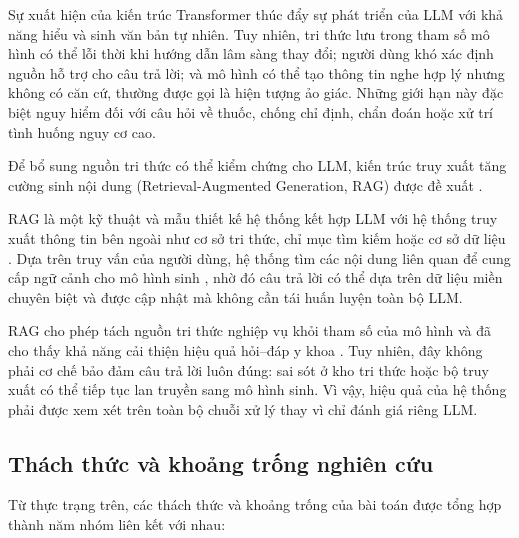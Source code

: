 Sự xuất hiện của kiến trúc Transformer \cite{vaswani2017} thúc đẩy sự phát triển của LLM với khả năng hiểu và sinh văn bản tự nhiên. Tuy nhiên, tri thức lưu trong tham số mô hình có thể lỗi thời khi hướng dẫn lâm sàng thay đổi; người dùng khó xác định nguồn hỗ trợ cho câu trả lời; và mô hình có thể tạo thông tin nghe hợp lý nhưng không có căn cứ, thường được gọi là hiện tượng ảo giác. Những giới hạn này đặc biệt nguy hiểm đối với câu hỏi về thuốc, chống chỉ định, chẩn đoán hoặc xử trí tình huống nguy cơ cao.

Để bổ sung nguồn tri thức có thể kiểm chứng cho LLM, kiến trúc truy xuất tăng cường sinh nội dung (Retrieval-Augmented Generation, RAG) được đề xuất \cite{lewis2020, karpukhin2020}.

\begin{definition}
\label{def:rag}
RAG là một kỹ thuật và mẫu thiết kế hệ thống kết hợp LLM với hệ thống truy xuất thông tin bên ngoài như cơ sở tri thức, chỉ mục tìm kiếm hoặc cơ sở dữ liệu \cite{nist_ai_100_2e2025, cheng2025knowledge}. Dựa trên truy vấn của người dùng, hệ thống tìm các nội dung liên quan để cung cấp ngữ cảnh cho mô hình sinh \cite{gao2023}, nhờ đó câu trả lời có thể dựa trên dữ liệu miền chuyên biệt và được cập nhật mà không cần tái huấn luyện toàn bộ LLM.
\end{definition}

RAG cho phép tách nguồn tri thức nghiệp vụ khỏi tham số của mô hình và đã cho thấy khả năng cải thiện hiệu quả hỏi--đáp y khoa \cite{medrag2024, xiong2024mirage}. Tuy nhiên, đây không phải cơ chế bảo đảm câu trả lời luôn đúng: sai sót ở kho tri thức hoặc bộ truy xuất có thể tiếp tục lan truyền sang mô hình sinh. Vì vậy, hiệu quả của hệ thống phải được xem xét trên toàn bộ chuỗi xử lý thay vì chỉ đánh giá riêng LLM.

\subsection{Thách thức và khoảng trống nghiên cứu}

Từ thực trạng trên, các thách thức và khoảng trống của bài toán được tổng hợp thành năm nhóm liên kết với nhau:

